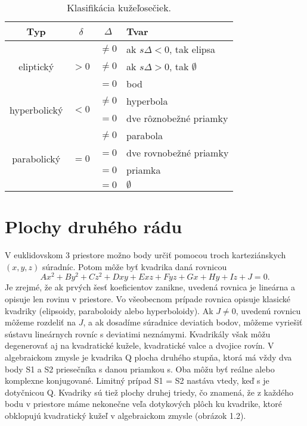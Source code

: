 \begin{table}[h]
\centering
\begin{tabular}{|c|c|c|l|}
\hline
\textbf{Typ} & $\delta$ & $\Delta$ & \textbf{Tvar}  \\
\hline
\multirow{3}{*}{eliptický} & \multirow{3}{*}{$> 0$} & $\neq 0$ & ak $s\Delta < 0$, tak elipsa \\
& & $\neq 0$ & ak $s\Delta > 0$, tak  $\emptyset$ \\
& & $= 0$ & bod \\
\hline
\multirow{2}{*}{hyperbolický} & \multirow{2}{*}{$< 0$} & $\neq0$ & hyperbola \\
 & & $=0$ & dve rôznobežné priamky \\
\hline
\multirow{4}{*}{parabolický} & \multirow{4}{*}{$= 0$} & $\neq0$ & parabola \\
& & $=0$ & dve rovnobežné priamky \\
& & $= 0$ & priamka \\
& & $= 0$ & $\emptyset$ \\
\hline
\end{tabular}
\caption{Klasifikácia kužeľosečiek.}
\label{tab:conic_sections}
\end{table}

\section{Plochy druhého rádu}
V euklidovskom $3$ priestore možno body určiť pomocou troch karteziánskych $(x, y, z)$ súradníc. Potom môže byť kvadrika daná rovnicou
\[ Ax^2 + By^2 + Cz^2 + Dxy + Exz + Fyz + Gx + Hy + Iz + J = 0. \]
Je zrejmé, že ak prvých šesť koeficientov zanikne, uvedená rovnica je lineárna a opisuje len rovinu v priestore. Vo všeobecnom prípade rovnica opisuje klasické kvadriky (elipsoidy, paraboloidy alebo hyperboloidy). Ak $J \neq 0$, uvedenú rovnicu môžeme rozdeliť na $J$, a ak dosadíme súradnice deviatich bodov, môžeme vyriešiť sústavu lineárnych rovníc s deviatimi neznámymi. Kvadrikály však môžu degenerovať aj na kvadratické kužele, kvadratické valce a dvojice rovín.
V algebraickom zmysle je kvadrika Q plocha druhého stupňa, ktorá má vždy dva body S1 a S2 priesečníka s danou priamkou s. Oba môžu byť reálne alebo komplexne konjugované. Limitný prípad S1 = S2 nastáva vtedy, keď s je dotyčnicou Q.
Kvadriky sú tiež plochy druhej triedy, čo znamená, že z každého bodu v priestore máme nekonečne veľa dotykových plôch ku kvadrike, ktoré obklopujú kvadratický kužeľ v algebraickom zmysle (obrázok 1.2).

